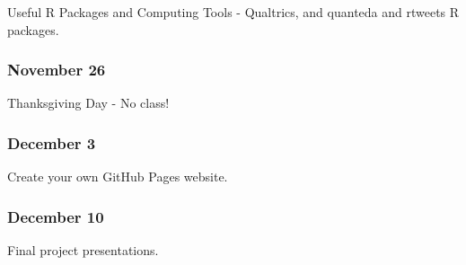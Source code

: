 \documentclass[11pt,]{article}
\begin{document}
Useful R Packages and Computing Tools - Qualtrics, and quanteda and
rtweets R packages.

\hypertarget{november-26}{%
\subsubsection{November 26}\label{november-26}}

Thanksgiving Day - No class!

\hypertarget{december-3}{%
\subsubsection{December 3}\label{december-3}}

Create your own GitHub Pages website.

\hypertarget{december-10}{%
\subsubsection{December 10}\label{december-10}}

Final project presentations.
\end{document}
